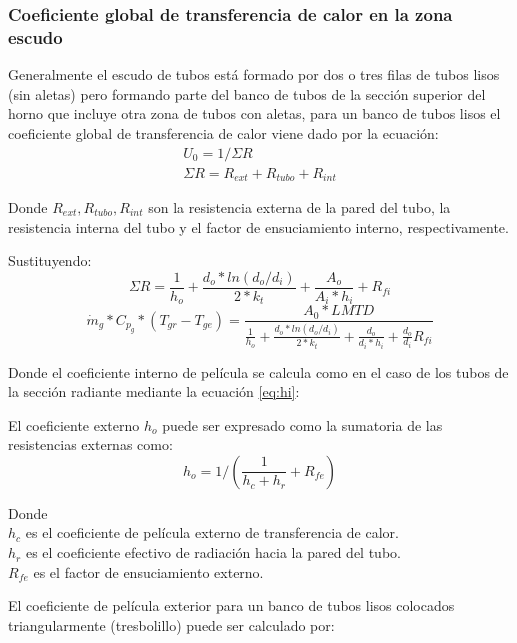 \subsubsection{Coeficiente global de transferencia de calor en la zona escudo}
\par Generalmente el escudo de tubos está formado por dos o tres filas de tubos lisos (sin aletas) pero formando parte del banco de tubos de la sección superior del horno que incluye otra zona de tubos con aletas, para un banco de tubos lisos el coeficiente global de transferencia de calor viene dado por la ecuación:
\begin{gather*}
\label{}
U_0  = 1 / \Sigma R \\
\Sigma R = R_{ext} + R_{tubo} + R_{int}
\end{gather*}
\par Donde $R_{ext}, R_{tubo}, R_{int}$ son la resistencia externa de la pared del tubo, la resistencia interna del tubo y el factor de ensuciamiento interno, respectivamente.
\par Sustituyendo:
\begin{equation}
\label{}
\Sigma R = \frac{1}{h_o} +\frac{d_o*ln(d_o/d_i)}{2*k_t} +\frac{A_o}{A_i*h_i} +R_{fi}
\end{equation}
\begin{equation}
\label{}
\dot m_{g} *C_{p_g} *(T_{gr} - T_{ge}) = \frac{A_0 *LMTD}
{\frac{1}{h_o} +\frac{d_o*ln(d_o/d_i)}{2*k_t} +\frac{d_o}{d_i*h_i} +\frac{d_o}{d_i}R_{fi}}
\end{equation}
\par Donde el coeficiente interno de película se calcula como en el caso de los tubos de la sección radiante mediante la ecuación \ref{eq:hi}:
\par El coeficiente externo $h_o$ puede ser expresado como la sumatoria de las resistencias externas como:
\begin{equation}
\label{eq:ho}
h_o = 1/(\frac{1}{h_c + h_{r}} + R_{fe})
\end{equation}
\par Donde \\
$h_c$ es el coeficiente de película externo de transferencia de calor.\\
$h_r$ es el coeficiente efectivo de radiación hacia la pared del tubo.\\
$R_{fe}$ es el factor de ensuciamiento externo.\\
\par El coeficiente de película exterior para un banco de tubos lisos colocados triangularmente (tresbolillo) puede ser calculado por:
